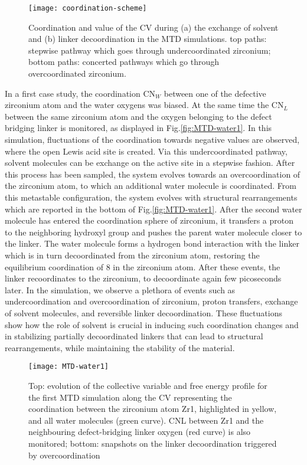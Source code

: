 \npar
\begin{figure}[!htbp]
	\centering
	\texttt{[image: coordination-scheme]}
	\caption{ Coordination and value of the CV during (a) the exchange of solvent and (b) linker decoordination in the MTD simulations. top paths: stepwise pathway which goes through undercoordinated zirconium; bottom paths: concerted pathways which go through overcoordinated zirconium.}
	\label{fig:coordination-scheme}
\end{figure}
In a first case study, the coordination CN$_W$ between one of the defective zirconium atom and the water oxygens was biased. At the same time the CN$_L$ between the same zirconium atom and the oxygen belonging to the defect bridging linker is monitored, as displayed in Fig.\ref{fig:MTD-water1}. In this simulation, fluctuations of the coordination towards negative values are observed, where the open Lewis acid site is created. Via this undercoordinated pathway, solvent molecules can be exchange on the active site in a stepwise fashion. After this process has been sampled, the system evolves towards an overcoordination of the zirconium atom, to which an additional water molecule is coordinated. From this metastable configuration, the system evolves with structural rearrangements which are reported in the bottom of Fig.\ref{fig:MTD-water1}. After the second water molecule has entered the coordination sphere of zirconium, it transfers a proton to the neighboring hydroxyl group and pushes the parent water molecule closer to the linker. The water molecule forms a hydrogen bond interaction with the linker which is in turn decoordinated from the zirconium atom, restoring the equilibrium coordination of 8 in the zirconium atom. After these events, the linker recoordinates to the zirconium, to decoordinate again few picoseconds later. In the simulation, we observe a plethora of events such as undercoordination and overcoordination of zirconium, proton transfers, exchange of solvent molecules, and reversible linker decoordination. These fluctuations show how the role of solvent is crucial in inducing such coordination changes and in stabilizing partially decoordinated linkers that can lead to structural rearrangements, while maintaining the stability of the material.  
\npar
\begin{figure}[!htbp]
	\centering
	\texttt{[image: MTD-water1]}
	\caption{Top: evolution of the collective variable and free energy profile for the first MTD simulation along the CV representing the coordination between the zirconium atom Zr1, highlighted in yellow, and all water molecules (green curve). CNL between Zr1 and the neighbouring defect-bridging linker oxygen (red curve) is also monitored; bottom: snapshots on the linker decoordination triggered by overcoordination}
	\label{fig: MTD-water1}
\end{figure}
